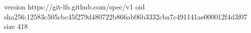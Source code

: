version https://git-lfs.github.com/spec/v1
oid sha256:12583c505cbc45f279d480722b866ab06b3332cba7c491141ae000012f4d3f07
size 418
